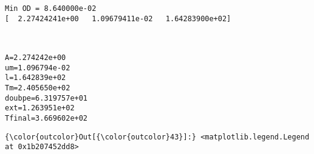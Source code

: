 \documentclass[11pt]{article}
\begin{document}
    \begin{Verbatim}[commandchars=\\\{\}]
Min OD = 8.640000e-02
[  2.27424241e+00   1.09679411e-02   1.64283900e+02]

    \end{Verbatim}

    \begin{center}
    \end{center}
    { \hspace*{\fill} \\}
    
    \begin{Verbatim}[commandchars=\\\{\}]
A=2.274242e+00
um=1.096794e-02
l=1.642839e+02
Tm=2.405650e+02
doubpe=6.319757e+01
ext=1.263951e+02
Tfinal=3.669602e+02

    \end{Verbatim}

            \begin{Verbatim}[commandchars=\\\{\}]
{\color{outcolor}Out[{\color{outcolor}43}]:} <matplotlib.legend.Legend at 0x1b207452dd8>
\end{Verbatim}
        
    \begin{center}
    \end{center}
    { \hspace*{\fill} \\}
    
    \begin{center}
    \end{center}
    { \hspace*{\fill} \\}
    
\end{document}
